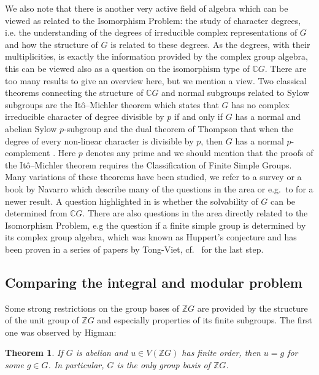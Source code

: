 \documentclass[11pt, a4paper]{amsart}
\newtheorem{theorem}{Theorem}[section]
\theoremstyle{definition}
\begin{document}
We also note that there is another very active field of algebra which can be viewed as related to the Isomorphism Problem: the study of character degrees, i.e. the understanding of the degrees of irreducible complex representations of $G$ and how the structure of $G$ is related to these degrees. As the degrees, with their multiplicities, is exactly the information provided by the complex group algebra, this can be viewed also as a question on the isomorphism type of $\mathbb{C}G$. There are too many results to give an overview here, but we mention a view. Two classical theorems connecting the structure of $\mathbb{C}G$ and normal subgroups related to Sylow subgroups are the It\^{o}--Michler theorem which states that $G$ has no complex irreducible character of degree divisible by $p$ if and only if $G$ has a normal and abelian Sylow $p$-subgroup \cite{Ito51, Michler86} and the dual theorem of Thompson that when the degree of every non-linear character is divisible by $p$, then $G$ has a normal $p$-complement \cite{Thompson70}. Here $p$ denotes any prime and we should mention that the proofs of the It\^{o}--Michler theorem requires the Classification of Finite Simple Groups. Many variations of these theorems have been studied, we refer to a survey \cite{Navarro16} or a book \cite{NavarroMcKay} by Navarro which describe many of the questions in the area or e.g.\ to \cite{GiannelliRizoSchaefferFry} for a newer result. A question highlighted in \cite[Chapter 7]{NavarroMcKay} is whether the solvability of $G$ can be determined from $\mathbb{C}G$. 
There are also questions in the area directly related to the Isomorphism Problem, e.g the question if a finite simple group is determined by its complex group algebra, which was known as Huppert's conjecture and has been proven in a series of papers by Tong-Viet, cf.\  \cite{TongVietHuppertClassical} for the last step. 

\subsection{Comparing the integral and modular problem}

Some strong restrictions on the group bases of $\mathbb{Z}G$ are provided by the structure of the unit group of $\mathbb{Z}G$ and especially properties of its finite subgroups. The first one was observed by Higman:

\begin{theorem}\cite{Higman40}
If $G$ is abelian and $u \in V(\mathbb{Z}G)$ has finite order, then $u = g$ for some $g \in G$. In particular, $G$ is the only group basis of $\mathbb{Z}G$.
\end{theorem}
\end{document}
